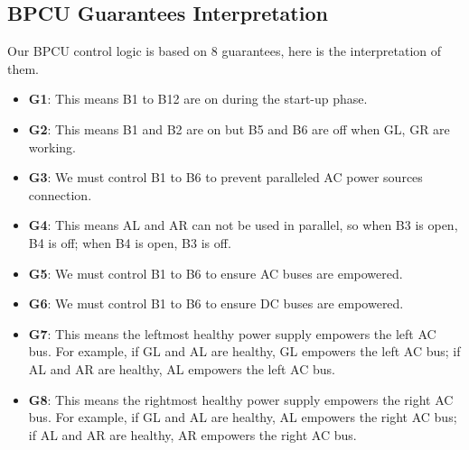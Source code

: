 \documentclass{mcmthesis}
\begin{document}
\subsection{BPCU Guarantees Interpretation}
Our BPCU control logic is based on 8 guarantees, here is the interpretation of them.
\begin{itemize}
\item \textbf{G1}: This means B1 to B12 are on during the start-up phase.
\item \textbf{G2}: This means B1 and B2 are on but B5 and B6 are off when GL, GR are working.
\item \textbf{G3}: We must control B1 to B6 to prevent paralleled AC power sources connection.
\item \textbf{G4}: This means AL and AR can not be used in parallel,  so when B3 is open, B4 is off; when B4 is open, B3 is off.
\item \textbf{G5}: We must control B1 to B6 to ensure AC buses are empowered.
\item \textbf{G6}: We must control B1 to B6 to ensure DC buses are empowered.
\item \textbf{G7}: This means the leftmost healthy power supply empowers the left AC bus. For example, if GL and AL are healthy, GL empowers the left AC bus; if AL and AR are healthy, AL empowers the left AC bus.
\item \textbf{G8}: This means the rightmost healthy power supply empowers the right AC bus. For example, if GL and AL are healthy, AL empowers the right AC bus; if AL and AR are healthy, AR empowers the right AC bus.
\end{itemize}
\end{document}
